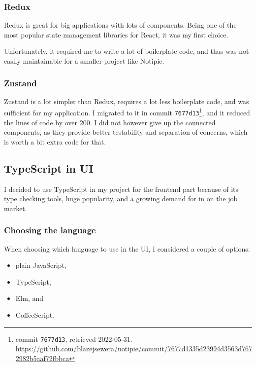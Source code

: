 \subsubsection{Redux}\label{redux}

Redux is great for big applications with lots of components. Being one
of the most popular state management libraries for React, it was my
first choice.

Unfortunately, it required me to write a lot of boilerplate code, and
thus was not easily maintainable for a smaller project like Notipie.

\subsubsection{Zustand}\label{zustand}

Zustand is a lot simpler than Redux, requires a lot less boilerplate
code, and was sufficient for my application. I migrated to it in commit
\texttt{7677d13}\footnote{commit \texttt{7677d13}, retrieved 2022-05-31.
\url{https://github.com/blazejsewera/notipie/commit/7677d1335d23994d3563d7672982b5aaf72fbbca}},
and it reduced the lines of code by over 200. I did not however give up
the connected components, as they provide better testability and
separation of concerns, which is worth a bit extra code for that.

\subsection{TypeScript in UI}\label{typescript-in-ui}

I decided to use TypeScript in my project for the frontend part because
of its type checking tools, huge popularity, and a growing demand for in
on the job market.

\subsubsection{Choosing the language}\label{choosing-the-language}

When choosing which language to use in the UI, I considered a couple of
options:

\begin{itemize}
  \item
    plain JavaScript,
  \item
    TypeScript,
  \item
    Elm, and
  \item
    CoffeeScript.
\end{itemize}


